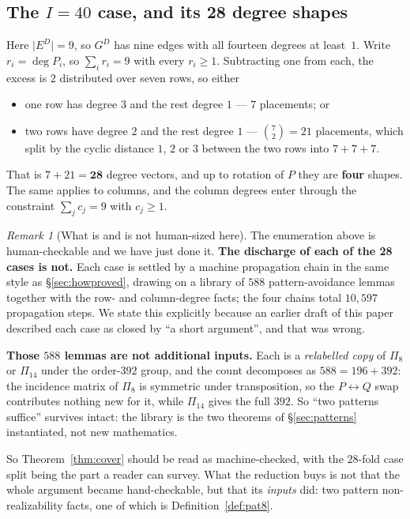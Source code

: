 \documentclass[11pt,a4paper]{article}
\theoremstyle{plain}
\theoremstyle{definition}
\theoremstyle{remark}
\newtheorem{remark}[theorem]{Remark}
\newcommand{\GD}{G^{D}}
\newcommand{\ED}{E^{D}}
\begin{document}
\subsection{The $I=40$ case, and its 28 degree shapes}

Here $\lvert \ED\rvert=9$, so $\GD$ has nine edges with all fourteen degrees at
least~$1$. Write $r_i=\deg P_i$, so $\sum_{i}r_i=9$ with every $r_i\ge1$.
Subtracting one from each, the excess is $2$ distributed over seven rows, so
either

\begin{itemize}[leftmargin=*,nosep]
  \item one row has degree $3$ and the rest degree $1$ --- $7$ placements; or
  \item two rows have degree $2$ and the rest degree $1$ --- $\binom{7}{2}=21$
    placements, which split by the cyclic distance $1$, $2$ or $3$ between the
    two rows into $7+7+7$.
\end{itemize}

That is $7+21=\mathbf{28}$ degree vectors, and up to rotation of $P$ they are
\textbf{four} shapes. The same applies to columns, and the column degrees enter
through the constraint $\sum_j c_j=9$ with $c_j\ge1$.

\begin{remark}[What is and is not human-sized here]\label{rem:cover-machine}
The enumeration above is human-checkable and we have just done it. \textbf{The
discharge of each of the 28 cases is not.} Each case is settled by a machine
propagation chain in the same style as \S\ref{sec:howproved}, drawing on a
library of $588$ pattern-avoidance lemmas together with the row- and
column-degree facts; the four chains total $10{,}597$ propagation steps. We
state this explicitly because an earlier draft of this paper described each case
as closed by ``a short argument'', and that was wrong.

\textbf{Those $588$ lemmas are not additional inputs.} Each is a
\emph{relabelled copy} of $\Pi_8$ or $\Pi_{14}$ under the order-$392$ group, and
the count decomposes as $588 = 196 + 392$: the incidence matrix of $\Pi_8$ is
symmetric under transposition, so the $P\leftrightarrow Q$ swap contributes
nothing new for it, while $\Pi_{14}$ gives the full $392$. So ``two patterns
suffice'' survives intact: the library is the two theorems of
\S\ref{sec:patterns} instantiated, not new mathematics.

So Theorem~\ref{thm:cover} should be read as machine-checked, with the $28$-fold
case split being the part a reader can survey. What the reduction buys is not
that the whole argument became hand-checkable, but that its \emph{inputs} did:
two pattern non-realizability facts, one of which is
Definition~\ref{def:pat8}.
\end{remark}
\end{document}
